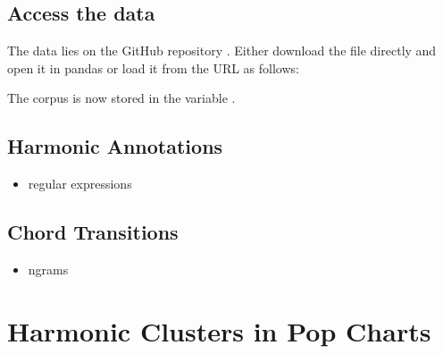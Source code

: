 \documentclass[letterpaper,10pt,english]{sphinxmanual}
\begin{document}
\section{Access the data}
\label{\detokenize{beethoven_harmony:access-the-data}}
The data lies on the GitHub repository .
Either download the  file directly and open it in pandas or load it from the URL as follows:

\begin{sphinxVerbatim}[commandchars=\\\{\}]
   

   
\end{sphinxVerbatim}

The corpus is now stored in the variable .


\section{Harmonic Annotations}
\label{\detokenize{beethoven_harmony:harmonic-annotations}}\begin{itemize}
\item {} 
regular expressions

\end{itemize}



\section{Chord Transitions}
\label{\detokenize{beethoven_harmony:chord-transitions}}\begin{itemize}
\item {} 
n\sphinxhyphen{}grams

\end{itemize}


\chapter{Harmonic Clusters in Pop Charts}
\label{\detokenize{billboard:harmonic-clusters-in-pop-charts}}\label{\detokenize{billboard::doc}}
\end{document}
